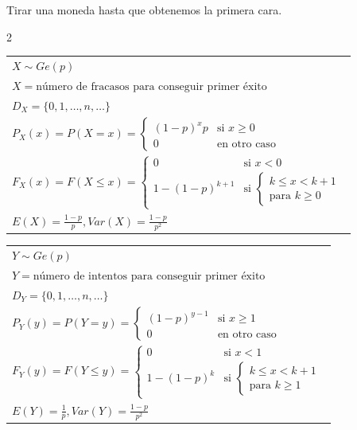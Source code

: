 \documentclass[10pt,a4paper]{article}
\begin{document}
\pagebreak

\begin{tcolorbox}[title=Geométrica, equal height group=DN2]
    Tirar una moneda hasta que obtenemos la primera cara.
    \begin{multicols}{2}
        \begin{tabular}{l}
            $X \sim Ge(p)$ \\
            $X = \text{número de fracasos para conseguir primer éxito}$ \\
            $D_X = \{0,1,\ldots,n,\ldots\}$ \\
            $P_X(x) = P(X = x) = \begin{cases} (1-p)^xp & \text{si } x \geq 0 \\ 0 & \text{en otro caso} \end{cases}$ \\
            $F_X(x) = F(X \leq x) = \begin{cases} 0 & \text{si } x < 0 \\ 1-(1-p)^{k+1} & \text{si } \begin{cases} k \leq x < k+1 \\ \text{para } k \geq 0 \end{cases}\end{cases}$ \\
            $E(X) = \frac{1-p}{p}, Var(X) = \frac{1-p}{p^2}$
        \end{tabular}

        \columnbreak

        \begin{tabular}{l}
            $Y \sim Ge(p)$ \\
            $Y = \text{número de intentos para conseguir primer éxito}$ \\
            $D_Y = \{0,1,\ldots,n,\ldots\}$ \\
            $P_Y(y) = P(Y = y) = \begin{cases} (1-p)^{y-1} & \text{si } x \geq 1 \\ 0 & \text{en otro caso} \end{cases}$ \\
            $F_Y(y) = F(Y \leq y) = \begin{cases} 0 & \text{si } x < 1 \\ 1-(1-p)^k & \text{si } \begin{cases} k \leq x < k+1 \\ \text{para } k \geq 1 \end{cases}\end{cases}$ \\
            $E(Y) = \frac{1}{p}, Var(Y) = \frac{1-p}{p^2}$
        \end{tabular}
    \end{multicols}
    \vspace*{5pt}
\end{tcolorbox}
\end{document}
